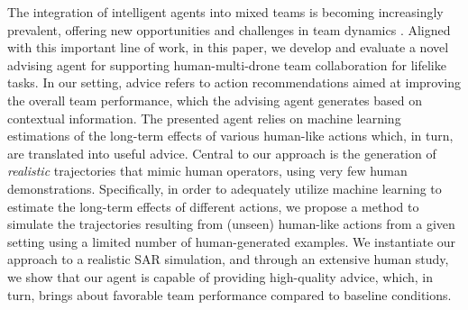 The integration of intelligent agents into mixed teams is becoming increasingly prevalent, offering new opportunities and challenges in team dynamics \cite{HumanAgent_Team_Dynamics,natarajan2024mixedinitiative}. Aligned with this important line of work, in this paper, we develop and evaluate a novel advising agent for supporting human-multi-drone team collaboration for lifelike tasks. 
In our setting, advice refers to action recommendations aimed at improving the overall team performance, which the advising agent generates based on contextual information. The presented agent relies on machine learning estimations of the long-term effects of various human-like actions which, in turn, are translated into useful advice. 
Central to our approach is the generation of \textit{realistic} trajectories that mimic human operators, using very few human demonstrations. Specifically, in order to adequately utilize machine learning to estimate the long-term effects of different actions, we propose a method to simulate the trajectories resulting from (unseen) human-like actions from a given setting using a limited number of human-generated examples. 
We instantiate our approach to a realistic SAR simulation, and through an extensive human study, we show that our agent is capable of providing high-quality advice, which, in turn, brings about favorable team performance compared to baseline conditions.






